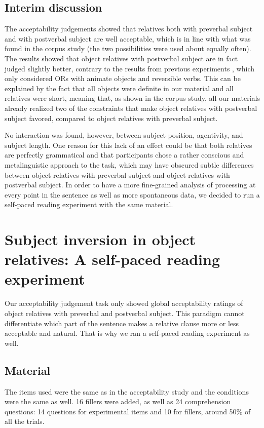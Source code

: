 \documentclass[output=paper]{langscibook}
\begin{document}
\subsection{Interim discussion}
The acceptability judgements showed that relatives both with preverbal subject and with postverbal subject are well acceptable, which is in line with what was found in the corpus study (the two possibilities were used about equally often). The results showed that object relatives with postverbal subject are in fact judged slightly better, contrary to the results from previous experiments \citep{Holmes1981, pozniak2015processing}, which only considered ORs with animate objects and reversible verbs. This can be explained by the fact that all objects were definite in our material and all relatives were short, meaning that, as shown in the corpus study, all our materials already realized two of the constraints that make object relatives with postverbal subject favored, compared to object relatives with preverbal subject.

No interaction was found, however, between subject position, agentivity, and subject length. One reason for this lack of an effect could be that both relatives are perfectly grammatical and that participants chose a rather conscious and metalinguistic approach to the task, which may have obscured subtle differences between object relatives with preverbal subject and object relatives with postverbal subject. In order to have a more fine-grained analysis of processing at every point in the sentence as well as more spontaneous data, we decided to run a self-paced reading experiment with the same material. 

\section{Subject inversion in object relatives: A self-paced reading experiment}\largerpage[2]

Our acceptability judgement task only showed global acceptability ratings of object relatives with preverbal and postverbal subject. This paradigm cannot differentiate which part of the sentence makes a relative clause more or less acceptable and natural. That is why we ran a self-paced reading experiment as well. 

\subsection{Material}
The items used were the same as in the acceptability study and the conditions were the same as well. 16 fillers were added, as well as 24 comprehension questions: 14 questions for experimental items and 10 for fillers, around 50\% of all the trials. 
\end{document}

